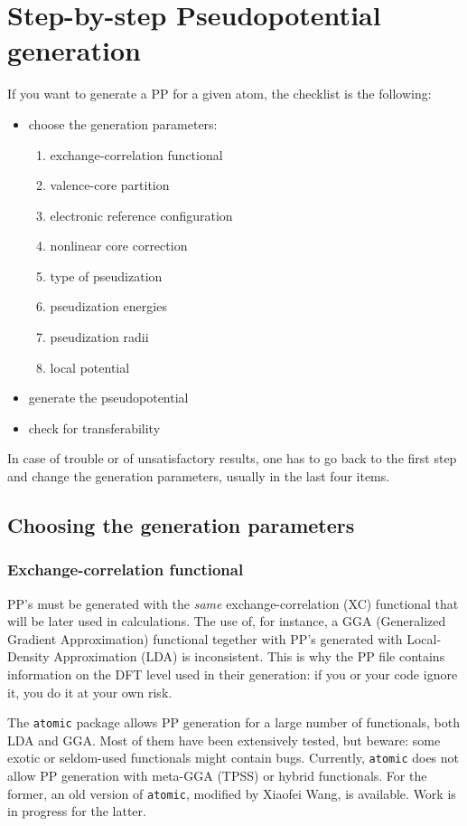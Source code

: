 \documentclass[12pt]{article}
\begin{document}
\section{Step-by-step Pseudopotential generation} 

If you want to generate a PP for a given atom, the checklist is the
following:

\begin{itemize}
\item choose the generation parameters:
\begin{enumerate}
\item exchange-correlation functional
\item valence-core partition
\item electronic reference configuration
\item nonlinear core correction
\item type of pseudization
\item pseudization energies 
\item pseudization radii
\item local potential
\end{enumerate}
\item generate the pseudopotential
\item check for transferability
\end{itemize}
In case of trouble or of unsatisfactory results, one has to 
go back to the first step and change the generation parameters,
usually in the last four items.

\subsection{Choosing the generation parameters}

\subsubsection{Exchange-correlation functional}
\label{XC}
PP's must be generated with the {\em same} exchange-correlation
(XC) functional that will
be later used in calculations. The use of, for instance, a
GGA (Generalized Gradient Approximation) functional tegether
with PP's generated with Local-Density Approximation (LDA) 
is inconsistent. This is why the PP file contains information 
on the DFT level used in their generation: if you or your code 
ignore it, you do it at your own risk.

The \texttt{atomic} package allows PP generation for a large number of 
functionals, both LDA and GGA. Most of them have 
been extensively tested, but beware: some exotic or seldom-used functionals 
might contain bugs. Currently, \texttt{atomic} does not allow PP generation
with meta-GGA (TPSS) or hybrid functionals. For the former, an old version 
of \texttt{atomic}, modified by Xiaofei Wang, is available. 
Work is in progress for the latter.
\end{document}
